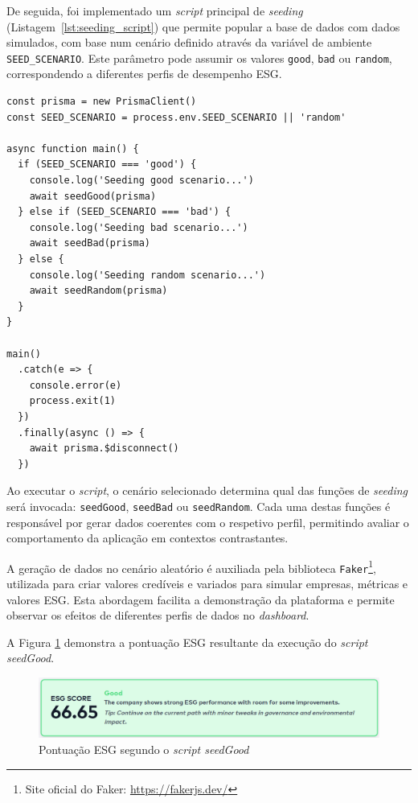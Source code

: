 De seguida, foi implementado um \textit{script} principal de \textit{seeding} (Listagem~\ref{lst:seeding_script}) que permite popular a base de dados com dados simulados, com base num cenário definido através da variável de ambiente \verb|SEED_SCENARIO|. Este parâmetro pode assumir os valores \verb|good|, \verb|bad| ou \verb|random|, correspondendo a diferentes perfis de desempenho ESG.

\begin{lstlisting}[style=customts, caption={\textit{Script} de \textit{seeding} da Base de Dados}, label={lst:seeding_script}]
const prisma = new PrismaClient()
const SEED_SCENARIO = process.env.SEED_SCENARIO || 'random'

async function main() {
  if (SEED_SCENARIO === 'good') {
    console.log('Seeding good scenario...')
    await seedGood(prisma)
  } else if (SEED_SCENARIO === 'bad') {
    console.log('Seeding bad scenario...')
    await seedBad(prisma)
  } else {
    console.log('Seeding random scenario...')
    await seedRandom(prisma)
  }
}

main()
  .catch(e => {
    console.error(e)
    process.exit(1)
  })
  .finally(async () => {
    await prisma.$disconnect()
  })
\end{lstlisting}

Ao executar o \textit{script}, o cenário selecionado determina qual das funções de \textit{seeding} será invocada: \texttt{seedGood}, \texttt{seedBad} ou \texttt{seedRandom}. Cada uma destas funções é responsável por gerar dados coerentes com o respetivo perfil, permitindo avaliar o comportamento da aplicação em contextos contrastantes.

A geração de dados no cenário aleatório é auxiliada pela biblioteca \texttt{Faker}\footnote{Site oficial do Faker: \url{https://fakerjs.dev/}}, utilizada para criar valores credíveis e variados para simular empresas, métricas e valores ESG. Esta abordagem facilita a demonstração da plataforma e permite observar os efeitos de diferentes perfis de dados no \textit{dashboard}.

A Figura \ref{fig:good_esg} demonstra a pontuação ESG resultante da execução do \textit{script seedGood}.

\begin{figure}[H]
    \centering
    \includegraphics[width=\linewidth,keepaspectratio]{frontmatter/assets/platform_prints/seeding/good_esg.png}
    \caption{Pontuação ESG segundo o \textit{script seedGood}}
    \label{fig:good_esg}
\end{figure}

